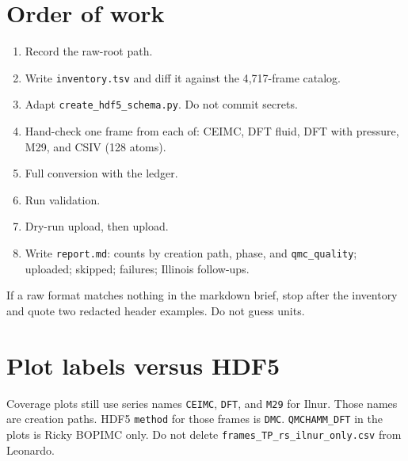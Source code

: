 \documentclass[11pt]{article}
\begin{document}
\section{Order of work}
\begin{enumerate}
\item Record the raw-root path.
\item Write \texttt{inventory.tsv} and diff it against the 4{,}717-frame catalog.
\item Adapt \texttt{create\_hdf5\_schema.py}. Do not commit secrets.
\item Hand-check one frame from each of: CEIMC, DFT fluid, DFT with pressure,
M29, and CSIV (128 atoms).
\item Full conversion with the ledger.
\item Run validation.
\item Dry-run upload, then upload.
\item Write \texttt{report.md}: counts by creation path, phase, and
\texttt{qmc\_quality}; uploaded; skipped; failures; Illinois follow-ups.
\end{enumerate}
If a raw format matches nothing in the markdown brief, stop after the
inventory and quote two redacted header examples. Do not guess units.

\section{Plot labels versus HDF5}
Coverage plots still use series names \texttt{CEIMC}, \texttt{DFT}, and
\texttt{M29} for Ilnur. Those names are creation paths. HDF5 \texttt{method}
for those frames is \texttt{DMC}. \texttt{QMCHAMM\_DFT} in the plots is Ricky
BOPIMC only. Do not delete \texttt{frames\_TP\_rs\_ilnur\_only.csv} from Leonardo.
\end{document}
